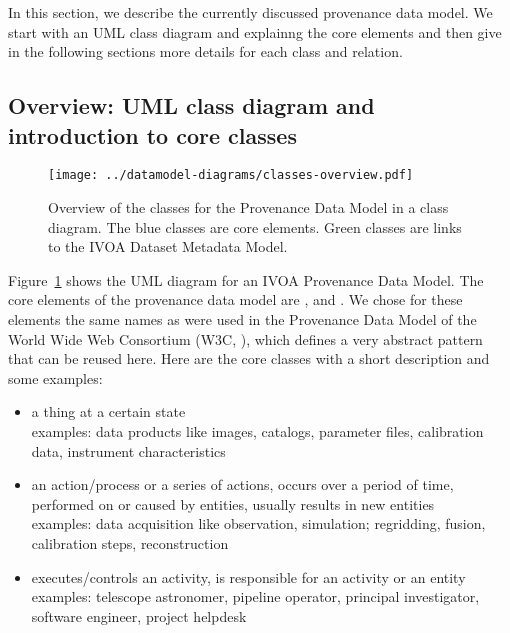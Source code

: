 In this section, we describe the currently discussed provenance data model. We 
start with an UML class diagram and explainng the core elements and then give 
in the following sections more details for each class and relation.

\subsection{Overview: UML class diagram and introduction to core classes}

\begin{figure}[h]
\centering
\texttt{[image: ../datamodel-diagrams/classes-overview.pdf]}
\caption{Overview of the classes for the Provenance Data Model in a class diagram. The blue classes are core elements.
Green classes are links to the IVOA Dataset Metadata Model.}
\label{fig:classdiagram}
\end{figure}



Figure~\ref{fig:classdiagram} shows the UML diagram for an IVOA Provenance Data
Model.
The core elements of the provenance data model are ,  and . 
We chose for these elements the same names as were used in the Provenance Data 
Model of the World Wide Web Consortium (W3C, \cite{std:W3CProvDM}), which defines 
a very abstract pattern that can be reused here. Here are the core classes with 
a short description and some examples:

\begin{itemize}
\item {} a thing at a certain state\\
    examples: data products like images, catalogs, parameter files, calibration data, instrument characteristics

\item {} an action/process or a series of actions, occurs over a period of time, performed on or caused by entities, usually results in new entities\\
    examples: data acquisition like observation, simulation; regridding, fusion, calibration steps, reconstruction

\item {} executes/controls an activity, is responsible for an activity or an entity\\
    examples: telescope astronomer, pipeline operator, principal investigator, software engineer, project helpdesk

\end{itemize}

